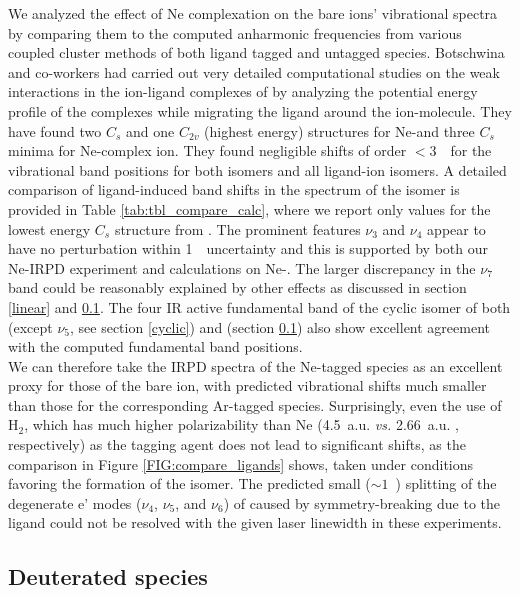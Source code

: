We analyzed the effect of Ne complexation on the bare ions' vibrational spectra by comparing them to the computed anharmonic frequencies from various coupled cluster methods of both ligand tagged and untagged species. Botschwina and co-workers \citep{Botschwina2011} had carried out very detailed computational studies on the weak interactions in the ion-ligand complexes of \iso by analyzing the potential energy profile of the complexes while migrating the ligand around the ion-molecule. They have found two $C_s$ and one $C_{2v}$ (highest energy) structures for Ne-\cyc and three $C_s$ minima for Ne-\lin complex ion. They found negligible shifts of order $<3$~\wn\ for the vibrational band positions for both \iso isomers and all ligand-ion isomers. A detailed comparison of ligand-induced band shifts in the spectrum of the \lin isomer is provided in Table \ref{tab:tbl_compare_calc}, where we report only values for the lowest energy $C_s$ structure from \citet{Botschwina2011}. The prominent features $\nu_3$ and $\nu_4$ appear to have no perturbation within 1~\wn\ uncertainty and this is supported by both our Ne-IRPD experiment and calculations on Ne-\linn. The larger discrepancy in the $\nu_7$ band could be reasonably explained by other effects as discussed in section \ref{linear} and \ref{deut}. The four IR active fundamental band of the cyclic isomer of both \iso (except $\nu_5$, see section \ref{cyclic}) and \isoD (section \ref{deut}) also show excellent agreement with the computed fundamental band positions. \\

We can therefore take the IRPD spectra of the Ne-tagged species as an excellent proxy for those of the bare ion, with predicted vibrational shifts much smaller than those for the corresponding Ar-tagged species. Surprisingly, even the use of H$_2$, which has much higher polarizability than Ne (4.5~a.u.  \citep{MH2018} {\textit{vs.}} 2.66~a.u. \citep{SN2018}, respectively) as the tagging agent does not lead to significant shifts, as the comparison in Figure \ref{FIG:compare_ligands} shows, taken under conditions favoring the formation of the \cyc isomer. The predicted small ($\sim 1$~\wnn) splitting of the degenerate e' modes ($\nu_4$, $\nu_5$, and $\nu_6$) of \cyc caused by symmetry-breaking due to the ligand could not be resolved with the given laser linewidth in these experiments. \\



\subsection{Deuterated species}
\label{deut}
\vspace{0.5cm}

